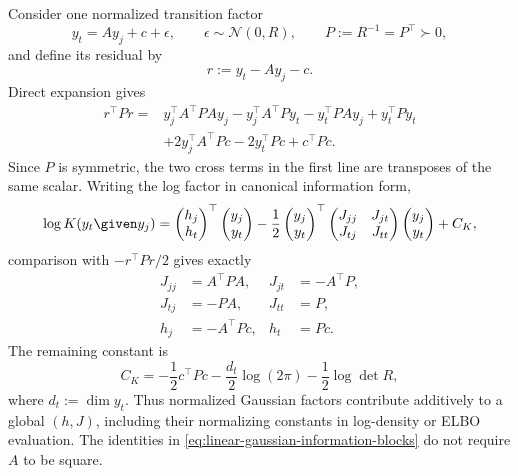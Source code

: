 Consider one normalized transition factor
\begin{equation}
y_t=Ay_j+c+\epsilon,
\qquad
\epsilon\sim\mathcal N(0,R),
\qquad
P:=R^{-1}=P^\top\succ0,
\label{eq:linear-gaussian-factor-setup}
\end{equation}
and define its residual by
\begin{equation}
r:=y_t-Ay_j-c.
\label{eq:linear-gaussian-transition-residual}
\end{equation}
Direct expansion gives
\begin{equation}
\begin{aligned}
r^\top P r
={}&y_j^\top A^\top P A y_j
-y_j^\top A^\top P y_t
-y_t^\top P A y_j
+y_t^\top P y_t\\
&+2y_j^\top A^\top P c
-2y_t^\top P c
+c^\top P c.
\end{aligned}
\label{eq:expanded-linear-gaussian-residual}
\end{equation}
Since $P$ is symmetric, the two cross terms in the first line are transposes of the same scalar. Writing the log factor in canonical information form,
\begin{equation}
\log K(y_t\given y_j)
=
\begin{pmatrix}h_j\\h_t\end{pmatrix}^{\top}
\begin{pmatrix}y_j\\y_t\end{pmatrix}
-\frac12
\begin{pmatrix}y_j\\y_t\end{pmatrix}^{\top}
\begin{pmatrix}
J_{jj}&J_{jt}\\
J_{tj}&J_{tt}
\end{pmatrix}
\begin{pmatrix}y_j\\y_t\end{pmatrix}
+C_K,
\label{eq:linear-gaussian-canonical-factor}
\end{equation}
comparison with $-r^\top P r/2$ gives exactly
\begin{equation}
\boxed{
\begin{aligned}
J_{jj}&=A^\top P A,
&J_{jt}&=-A^\top P,\\
J_{tj}&=-P A,
&J_{tt}&=P,\\
h_j&=-A^\top P c,
&h_t&=P c.
\end{aligned}}
\label{eq:linear-gaussian-information-blocks}
\end{equation}
The remaining constant is
\begin{equation}
C_K
=-\frac12c^\top P c
-\frac{d_t}{2}\log(2\pi)
-\frac12\log\det R,
\label{eq:linear-gaussian-factor-constant}
\end{equation}
where $d_t:=\dim y_t$. Thus normalized Gaussian factors contribute additively to a global $(h,J)$, including their normalizing constants in log-density or ELBO evaluation. The identities in \cref{eq:linear-gaussian-information-blocks} do not require $A$ to be square.

